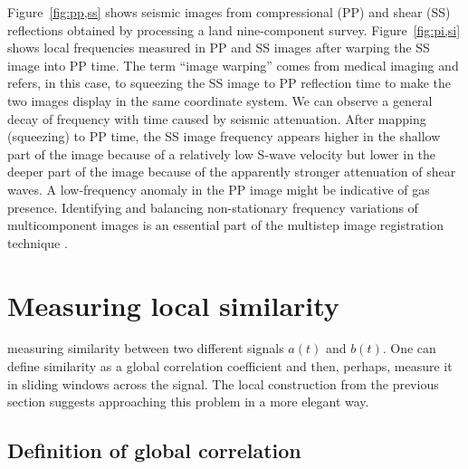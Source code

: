 

Figure~\ref{fig:pp,ss} shows seismic images from compressional (PP)
and shear (SS) reflections obtained by processing a land
nine-component survey. Figure~\ref{fig:pi,si} shows local frequencies
measured in PP and SS images after warping the SS image into PP time.
The term ``image warping'' comes from medical imaging \cite[]{wolberg}
and refers, in this case, to squeezing the SS image to PP reflection
time to make the two images display in the same coordinate system. We
can observe a general decay of frequency with time caused by seismic
attenuation. After mapping (squeezing) to PP time, the SS image
frequency appears higher in the shallow part of the image because of a
relatively low S-wave velocity but lower in the deeper part of the
image because of the apparently stronger attenuation of shear waves. A
low-frequency anomaly in the PP image might be indicative of gas
presence. Identifying and balancing non-stationary frequency
variations of multicomponent images is an essential part of the
multistep image registration technique
\cite[]{SEG-2003-07810784,warp}.

\section{Measuring local similarity}

  measuring
similarity between two different signals $a(t)$ and $b(t)$. One can
define similarity as a global correlation coefficient and then,
perhaps, measure it in sliding windows across the signal. The local
construction from the previous section suggests approaching this
problem in a more elegant way.

\subsection{Definition of global correlation}

